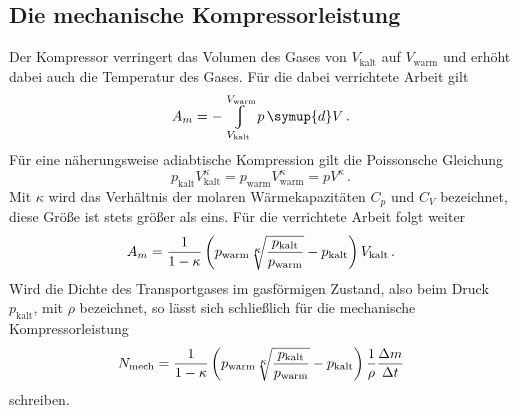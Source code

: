 \subsection{Die mechanische Kompressorleistung}
Der Kompressor verringert das Volumen des Gases von $V_\text{kalt}$ auf $V_\text{warm}$
und erhöht dabei auch die Temperatur des Gases. Für die dabei verrichtete Arbeit gilt
\begin{equation}
  A_m = - \displaystyle\varint\displaylimits_{V_\text{kalt}}^{V_\text{warm}} p \, \symup{d}V\,.
  \label{eqn:arbeitkompressor1}
\end{equation}
Für eine näherungsweise adiabtische Kompression gilt die Poissonsche Gleichung
\begin{equation}
  p_\text{kalt} V_\text{kalt}^{\kappa} = p_\text{warm} V_\text{warm}^{\kappa} = p V^{\kappa}\,.
  \label{eqn:poisson}
\end{equation}
Mit $\kappa$ wird das Verhältnis der molaren Wärmekapazitäten $C_p$ und $C_V$
bezeichnet, diese Größe ist stets größer als eins.
Für die verrichtete Arbeit folgt weiter
\begin{equation}
  A_m = \frac{1}{1 - \kappa} \left(p_\text{warm} \sqrt[\leftroot{-1}\uproot{-1}\scriptstyle \kappa]{\frac{p_\text{kalt}}{p_\text{warm}}} - p_\text{kalt} \right) V_\text{kalt}\,.
  \label{eqn:arbeitkompressor2}
\end{equation}
Wird die Dichte des Transportgases im gasförmigen Zustand, also beim Druck $p_\text{kalt}$,
mit $\rho$ bezeichnet, so lässt sich schließlich für die mechanische Kompressorleistung
\begin{equation}
  N_\text{mech} = \frac{1}{1 - \kappa} \left(p_\text{warm} \sqrt[\leftroot{-1}\uproot{-1}\scriptstyle \kappa]{\frac{p_\text{kalt}}{p_\text{warm}}} - p_\text{kalt} \right) \frac{1}{\rho} \frac{\Delta m}{\Delta t}
  \label{eqn:kompressorleistung}
\end{equation}
schreiben.

